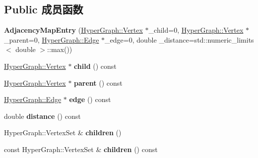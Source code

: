\subsection*{Public 成员函数}
\begin{DoxyCompactItemize}
\item 
\hypertarget{structg2o_1_1HyperDijkstra_1_1AdjacencyMapEntry_a160f87d80b7c2137abcce561fbc5feed}{{\bfseries Adjacency\-Map\-Entry} (\hyperlink{classg2o_1_1HyperGraph_1_1Vertex}{Hyper\-Graph\-::\-Vertex} $\ast$\-\_\-child=0, \hyperlink{classg2o_1_1HyperGraph_1_1Vertex}{Hyper\-Graph\-::\-Vertex} $\ast$\-\_\-parent=0, \hyperlink{classg2o_1_1HyperGraph_1_1Edge}{Hyper\-Graph\-::\-Edge} $\ast$\-\_\-edge=0, double \-\_\-distance=std\-::numeric\-\_\-limits$<$ double $>$\-::max())}\label{structg2o_1_1HyperDijkstra_1_1AdjacencyMapEntry_a160f87d80b7c2137abcce561fbc5feed}

\item 
\hypertarget{structg2o_1_1HyperDijkstra_1_1AdjacencyMapEntry_a16b56779c464b948cb0a102929e1c5f2}{\hyperlink{classg2o_1_1HyperGraph_1_1Vertex}{Hyper\-Graph\-::\-Vertex} $\ast$ {\bfseries child} () const }\label{structg2o_1_1HyperDijkstra_1_1AdjacencyMapEntry_a16b56779c464b948cb0a102929e1c5f2}

\item 
\hypertarget{structg2o_1_1HyperDijkstra_1_1AdjacencyMapEntry_a2955ede218d2843f1ceae9402e3a9c23}{\hyperlink{classg2o_1_1HyperGraph_1_1Vertex}{Hyper\-Graph\-::\-Vertex} $\ast$ {\bfseries parent} () const }\label{structg2o_1_1HyperDijkstra_1_1AdjacencyMapEntry_a2955ede218d2843f1ceae9402e3a9c23}

\item 
\hypertarget{structg2o_1_1HyperDijkstra_1_1AdjacencyMapEntry_a4cbdf1ab4ad29ab534cad318ca6898dc}{\hyperlink{classg2o_1_1HyperGraph_1_1Edge}{Hyper\-Graph\-::\-Edge} $\ast$ {\bfseries edge} () const }\label{structg2o_1_1HyperDijkstra_1_1AdjacencyMapEntry_a4cbdf1ab4ad29ab534cad318ca6898dc}

\item 
\hypertarget{structg2o_1_1HyperDijkstra_1_1AdjacencyMapEntry_a40a498bd2fae5c3a4a25d91599e22f9f}{double {\bfseries distance} () const }\label{structg2o_1_1HyperDijkstra_1_1AdjacencyMapEntry_a40a498bd2fae5c3a4a25d91599e22f9f}

\item 
\hypertarget{structg2o_1_1HyperDijkstra_1_1AdjacencyMapEntry_aa1a11048612968381db6a0ad525f7e0d}{Hyper\-Graph\-::\-Vertex\-Set \& {\bfseries children} ()}\label{structg2o_1_1HyperDijkstra_1_1AdjacencyMapEntry_aa1a11048612968381db6a0ad525f7e0d}

\item 
\hypertarget{structg2o_1_1HyperDijkstra_1_1AdjacencyMapEntry_a631ac78faf06416839df66a8c93aab9e}{const Hyper\-Graph\-::\-Vertex\-Set \& {\bfseries children} () const }\label{structg2o_1_1HyperDijkstra_1_1AdjacencyMapEntry_a631ac78faf06416839df66a8c93aab9e}

\end{DoxyCompactItemize}
